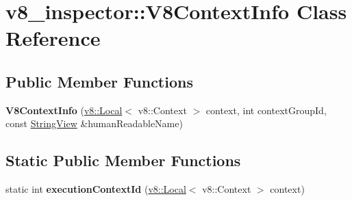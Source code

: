 \hypertarget{classv8__inspector_1_1V8ContextInfo}{}\section{v8\+\_\+inspector\+:\+:V8\+Context\+Info Class Reference}
\label{classv8__inspector_1_1V8ContextInfo}
\subsection*{Public Member Functions}
\begin{DoxyCompactItemize}
\item 
\mbox{\label{classv8__inspector_1_1V8ContextInfo_a820147b336211cd5fef928151bd143c4}} 
{\bfseries V8\+Context\+Info} (\mbox{\hyperlink{classv8_1_1Local}{v8\+::\+Local}}$<$ v8\+::\+Context $>$ context, int context\+Group\+Id, const \mbox{\hyperlink{classv8__inspector_1_1StringView}{String\+View}} \&human\+Readable\+Name)
\end{DoxyCompactItemize}
\subsection*{Static Public Member Functions}
\begin{DoxyCompactItemize}
\item 
\mbox{\label{classv8__inspector_1_1V8ContextInfo_a8fad8315e1b66cc92ddd733595fe9087}} 
static int {\bfseries execution\+Context\+Id} (\mbox{\hyperlink{classv8_1_1Local}{v8\+::\+Local}}$<$ v8\+::\+Context $>$ context)
\end{DoxyCompactItemize}
